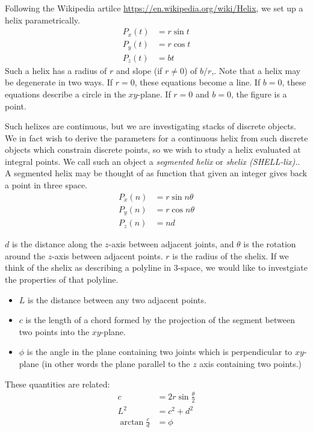 \documentclass[11pt]{article}
\begin{document}
{Following the Wikipedia artilce \url{https://en.wikipedia.org/wiki/Helix}, we set up a helix parametrically.
\begin{align*}
    P_x(t) &= r \sin{t}  \\
    P_y(t) &= r \cos{t} \\
   P_z(t) &= b t
\end{align*}
Such a helix has a radius of $r$ and slope (if $r \neq 0$) of $b/r$,. Note that a helix may be degenerate in two ways.
If $r = 0$, these equations become a line. If $b = 0$, these equations describe a circle in the $xy$-plane.
If $r = 0$ and $b = 0$, the figure is a point.

Such helixes are continuous, but we are investigating stacks of discrete objects. We in fact wish to derive
the parameters for a continuous helix from such discrete objects which constrain discrete points, so we wish
to study a helix evaluated at integral points. We call such an object a {\em segmented helix} or {\em shelix (SHELL-lix).}.
A segmented helix may be thought of as function that given an integer gives back a point in three space.
\begin{align*}
    P_x(n) &= r \sin{n \theta}  \\
    P_y(n) &= r \cos{n \theta} \\
   P_z(n) &= n d
\end{align*}

$d$ is the distance along the $z$-axis between adjacent joints, and $\theta$ is the rotation around the $z$-axis between adjacent points. $r$ is the radius of the shelix. If we think of the shelix as describing a polyline in 3-space, we would like to investgiate
the properties of that polyline.

\begin{itemize}
\item $L$ is the distance between any two adjacent points.
\item $c$ is the length of a chord formed by the projection of the segment between two points into the $xy$-plane.
\item $\phi$ is the angle in the plane containing two joints which is perpendicular to $xy$-plane
  (in other words the plane parallel to the $z$ axis containing two points.)
  \end{itemize}
These quantities are related:
\begin{align}
    c &= 2r\sin{\frac{\theta}{2}} \\
    L^2 &= c^2+d^2  \\
    \arctan{\frac{c}{d}}  &= \phi 
\end{align}

}
\end{document}
